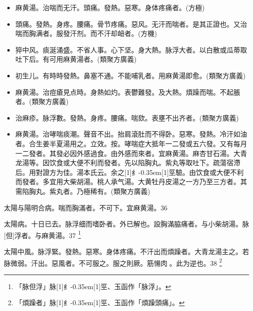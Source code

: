 \documentclass[oneside,b4paper]{ctexbook}
\begin{document}
\begin{flushleft}
\begin{itemize}
\item 麻黄湯。治喘而无汗。頭痛。發熱。惡寒。身体疼痛者。(方極)
\item 頭痛。發熱。身疼。腰痛。骨节疼痛。惡风。无汗而喘者。是其正證也。又治喘而胸满者。服發汗剂。而不汗却衄者。(方機)
\item 猝中风。痰涎涌盛。不省人事。心下坚。身大熱。脉浮大者。以白散或瓜蒂取吐下后。有可用麻黄湯者。(類聚方廣義)
\item 初生儿。有時時發熱。鼻塞不通。不能哺乳者。用麻黄湯即愈。(類聚方廣義)
\item 麻黄湯。治痘瘡見点時。身熱如灼。表鬱難發。及大熱。煩躁而喘。不起脹者。(類聚方廣義)
\item 治麻疹。脉浮數。發熱。身疼。腰痛。喘欬。表壅不出齐者。(類聚方廣義)
\item 麻黄湯。治哮喘痰潮。聲音不出。抬肩滾肚而不得卧。惡寒。發熱。冷汗如油者。合生姜半夏湯用之。立效。按。哮喘症大抵年一二發或五六發。又有每月一二發者。其發必因外感過食。由外感而來者。宜麻黄湯。麻杏甘石湯。大青龙湯等。因饮食或大便不利而發者。先以陷胸丸。紫丸等取吐下。疏蕩宿滯后。用對證方为佳。湯本氏云。余之{\hbox{\scalebox{0.68}[1]{纟}\kern-0.35em\scalebox{0.64}[1]{巠}}}驗。由饮食或大便不利而發者。多宜用大柴胡湯。桃人承气湯。大黄牡丹皮湯之一方乃至三方者。其需陷胸丸。紫丸者。乃極稀有。(類聚方廣義)
\end{itemize}

太陽与陽明合病。喘而胸滿者。不可下。宜麻黄湯。36

太陽病。十日已去。脉浮细而嗜卧者。外已解也。設胸滿脇痛者。与小柴胡湯。脉[但]浮者。与麻黄湯。37
\footnote{「脉但浮」脉{\hbox{\scalebox{0.68}[1]{纟}\kern-0.35em\scalebox{0.64}[1]{巠}}}、玉函作「脉浮」。}

太陽中風。脉浮緊。發熱。惡寒。身体疼痛。不汗出而煩躁者。大青龙湯主之。若脉微弱。汗出。惡風者。不可服之。服之則厥。筋愓肉{𥆧}。此为逆也。38
\footnote{「煩躁者」脉{\hbox{\scalebox{0.68}[1]{纟}\kern-0.35em\scalebox{0.64}[1]{巠}}}、玉函作「煩躁頭痛」。}


\end{flushleft}
\end{document}
